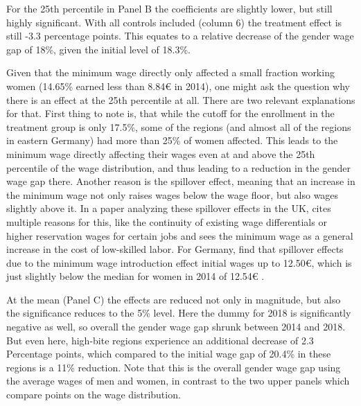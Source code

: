 \documentclass[12pt,draft,a4paper]{article}
\begin{document}
For the 25th percentile in Panel B the coefficients are slightly lower, but still highly significant.
With all controls included (column 6) the treatment effect is still -3.3 percentage points.
This equates to a relative decrease of the gender wage gap of 18\%, given the initial level of 18.3\%.

Given that the minimum wage directly only affected a small fraction working women (14.65\% earned less than 8.84€ in 2014), one might ask the question why there is an effect at the 25th percentile at all.
There are two relevant explanations for that.
First thing to note is, that while the cutoff for the enrollment in the treatment group is only 17.5\%,
some of the regions (and almost all of the regions in eastern Germany)
had more than 25\% of women affected. This leads to the minimum wage directly affecting their wages even at and above the 25th percentile of the wage distribution, and thus leading to a reduction in the gender wage gap there.
Another reason is the spillover effect, meaning that an increase in the minimum wage not only raises wages below the wage floor, but also wages slightly above it.
In a paper analyzing these spillover effects in the UK, \citet{Stewart12Wage} cites multiple reasons for this, like the continuity of existing wage differentials or higher reservation wages for certain jobs and sees the minimum wage as a general increase in the cost of low-skilled labor.
For Germany, \citet{Dustman21Reallocation} find that spillover effects due to the minimum wage introduction effect initial wages up to 12.50€, which is just slightly below the median for women in 2014 of 12.54€ \citep[see][Table 1]{CALIENDO22}. 

At the mean (Panel C) the effects are reduced not only in magnitude, but also the significance reduces to the 5\% level. 
Here the dummy for 2018 is significantly negative as well, so overall the gender wage gap shrunk between 2014 and 2018.
But even here, high-bite regions experience an additional decrease of 2.3 Percentage points, which compared to the initial wage gap of 20.4\% in these regions is a 11\% reduction.
Note that this is the overall gender wage gap using the average wages of men and women, in contrast to the two upper panels which compare points on the wage distribution.
\end{document}
